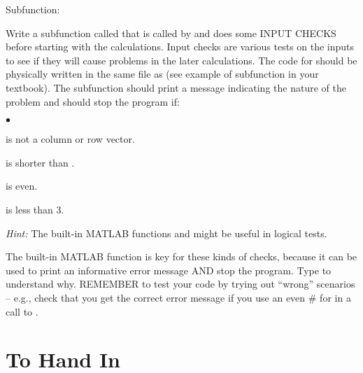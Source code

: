 \documentclass[letterpaper,12pt]{article}
\newcounter{lnum}
\newenvironment{abbrevlist}%
  {\begin{list}{$\bullet$}{\setlength{\leftmargin}{2em}%
               \setlength{\itemindent}{0em}%
               \setlength{\itemsep}{0pt}%
               \setlength{\parsep}{0pt}%
               \setlength{\topsep}{2pt}%
               \usecounter{lnum} } }{\end{list}}
\begin{document}
\begin{enumerate}
\item{Subfunction: }

Write a subfunction called  that is called by  and does some INPUT CHECKS before starting 
with the calculations. Input checks are various tests on the inputs to see if they will cause problems in the later calculations. 
The code for 
should be physically written in the same file as  (see example of subfunction in your textbook).  The subfunction should print
a message indicating the nature of the problem and should stop the program if:
\begin{abbrevlist}
\item {} is not a column or row vector.  %
\item {} is shorter than .  %
\item {} is even.  %
\item {} is less than 3.  %
\end{abbrevlist}
{\it Hint:} The built-in MATLAB functions  and  might be useful in logical tests.

The built-in MATLAB function  is key for these kinds of checks, because it can be used to print an informative error
message AND stop the program. Type  to understand why.
REMEMBER to test your code by trying out ``wrong'' scenarios -- e.g., check that you get the correct error message 
if you use an even \# for  in a call to .

%

\end{enumerate}
\section*{To Hand In}
\end{document}

